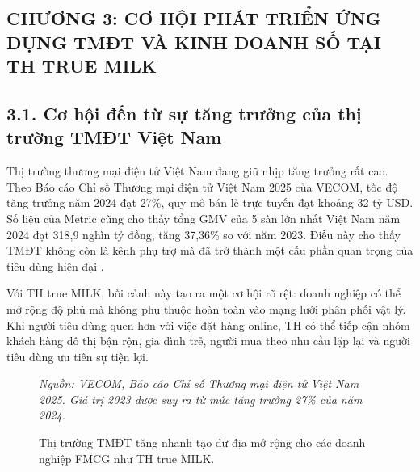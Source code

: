 \subsection*{CHƯƠNG 3: CƠ HỘI PHÁT TRIỂN ỨNG DỤNG TMĐT VÀ KINH DOANH SỐ TẠI TH TRUE MILK}

\subsection*{3.1. Cơ hội đến từ sự tăng trưởng của thị trường TMĐT Việt Nam}
Thị trường thương mại điện tử Việt Nam đang giữ nhịp tăng trưởng rất cao. Theo Báo cáo Chỉ số Thương mại điện tử Việt Nam 2025 của VECOM, tốc độ tăng trưởng năm 2024 đạt 27\%, quy mô bán lẻ trực tuyến đạt khoảng 32 tỷ USD. Số liệu của Metric cũng cho thấy tổng GMV của 5 sàn lớn nhất Việt Nam năm 2024 đạt 318,9 nghìn tỷ đồng, tăng 37,36\% so với năm 2023. Điều này cho thấy TMĐT không còn là kênh phụ trợ mà đã trở thành một cấu phần quan trọng của tiêu dùng hiện đại \cite{vecom2025,metric2024}.

Với TH true MILK, bối cảnh này tạo ra một cơ hội rõ rệt: doanh nghiệp có thể mở rộng độ phủ mà không phụ thuộc hoàn toàn vào mạng lưới phân phối vật lý. Khi người tiêu dùng quen hơn với việc đặt hàng online, TH có thể tiếp cận nhóm khách hàng đô thị bận rộn, gia đình trẻ, người mua theo nhu cầu lặp lại và người tiêu dùng ưu tiên sự tiện lợi.

\begin{figure}[H]
\centering
{}

\vspace{0.1cm}
{\small \textit{Nguồn: VECOM, Báo cáo Chỉ số Thương mại điện tử Việt Nam 2025. Giá trị 2023 được suy ra từ mức tăng trưởng 27\% của năm 2024.}}
\caption{Thị trường TMĐT tăng nhanh tạo dư địa mở rộng cho các doanh nghiệp FMCG như TH true MILK.}
\end{figure}

